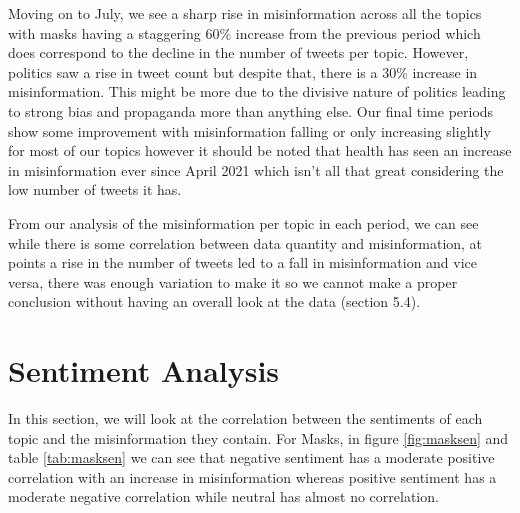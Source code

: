 \documentclass{l4proj}
\begin{document}
Moving on to July, we see a sharp rise in misinformation across all the topics with masks having a staggering 60\% increase from the previous period which does correspond to the decline in the number of tweets per topic. However, politics saw a rise in tweet count but despite that, there is a 30\% increase in misinformation. This might be more due to the divisive nature of politics leading to strong bias and propaganda more than anything else. Our final time periods show some improvement with misinformation falling or only increasing slightly for most of our topics however it should be noted that health has seen an increase in misinformation ever since April 2021 which isn't all that great considering the low number of tweets it has.

From our analysis of the misinformation per topic in each period, we can see while there is some correlation between data quantity and misinformation, at points a rise in the number of tweets led to a fall in misinformation and vice versa, there was enough variation to make it so we cannot make a proper conclusion without having an overall look at the data (section 5.4).

\section{Sentiment Analysis}

In this section, we will look at the correlation between the sentiments of each topic and the misinformation they contain. For Masks, in figure \ref{fig:masksen} and table \ref{tab:masksen} we can see that negative sentiment has a moderate positive correlation with an increase in misinformation whereas positive sentiment has a moderate negative correlation while neutral has almost no correlation.
\end{document}
